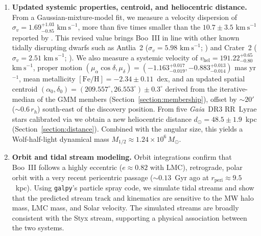 \documentclass[twocolumn]{aastex631}
\newcommand{\gaia}{\textit{Gaia}\xspace}
\newcommand{\vlosUnits}{$\mathrm{km~s}^{-1}$\xspace}
\newcommand{\pmUnits}{mas yr$^{-1}$\xspace}
\begin{document}
\begin{enumerate}[leftmargin=*]

\item \textbf{Updated systemic properties, centroid, and heliocentric distance.} From a Gaussian-mixture-model fit, we measure a velocity dispersion of $\sigma_{v} = 1.69^{+1.03}_{-0.85}$ \vlosUnits, more than five times smaller than the $10.7 \pm 3.5$ \vlosUnits reported by \citet{Carlin2018}. This revised value brings Boo~III in line with other known tidally disrupting dwarfs such as Antlia~2 ($\sigma_v = 5.98$ \vlosUnits; \citealt{Ji2021}) and Crater~2 ($\sigma_v = 2.51$ \vlosUnits; \citealt{Limberg2025}). We also measure a systemic velocity of $v_{\mathrm{hel}} = 191.22^{+0.65}_{-0.80}$ \vlosUnits, proper motion $(\mu_{\alpha} \cos{\delta}, \mu_\delta) = (-1.163^{+0.017}_{-0.019}, -0.883^{+0.013}_{-0.014})$ \pmUnits, mean metallicity $\mathrm{[Fe/H]} = -2.34 \pm 0.11$~dex, and an updated spatial centroid $(\alpha_0, \delta_0) = (209.557^\circ, 26.553^\circ) \pm 0.3^\circ$ derived from the iterative-median of the GMM members (Section~\ref{section:membership}), offset by $\sim 20'$ ($\sim 0.6\,r_h$) south-east of the \citet{Grillmair2009} discovery position. From five \gaia\ DR3 RR~Lyrae stars calibrated via \citet{Garofalo2022} we obtain a new heliocentric distance $d_\odot = 48.5 \pm 1.9$~kpc (Section~\ref{section:distance}). Combined with the \citet{Moskowitz2020} angular size, this yields a Wolf-half-light dynamical mass $M_{1/2} \approx 1.24 \times 10^{6}\,M_\odot$.

\item \textbf{Orbit and tidal stream modeling.} Orbit integrations confirm that Boo~III follows a highly eccentric ($e \approx 0.82$ with LMC), retrograde, polar orbit with a very recent pericentric passage ($\sim 0.13$~Gyr ago at $r_{\mathrm{peri}} \approx 9.5$~kpc). Using \texttt{galpy}'s particle spray code, we simulate tidal streams and show that the predicted stream track and kinematics are sensitive to the MW halo mass, LMC mass, and Solar velocity. The simulated streams are broadly consistent with the Styx stream, supporting a physical association between the two systems.


\end{enumerate}
\end{document}

